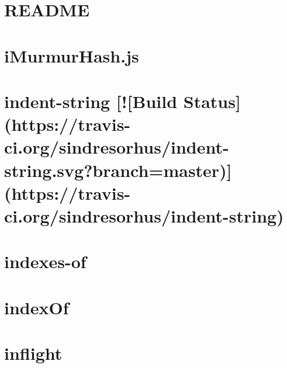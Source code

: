 \documentclass[twoside]{book}
\newcommand{\+}{\discretionary{\mbox{\scriptsize$\hookleftarrow$}}{}{}}
\begin{document}
\chapter{R\+E\+A\+D\+ME}
\label{md__c_1_workspace_demo_src_main_script_node_modules_ignore__r_e_a_d_m_e}

\chapter{i\+Murmur\+Hash.\+js}
\label{md__c_1_workspace_demo_src_main_script_node_modules_imurmurhash__r_e_a_d_m_e}

\chapter{indent-\/string \mbox{[}!\mbox{[}Build Status\mbox{]}(https\+://travis-\/ci.org/sindresorhus/indent-\/string.svg?branch=master)\mbox{]}(https\+://travis-\/ci.org/sindresorhus/indent-\/string)}
\label{md__c_1_workspace_demo_src_main_script_node_modules_indent-string_readme}

\chapter{indexes-\/of}
\label{md__c_1_workspace_demo_src_main_script_node_modules_indexes-of__r_e_a_d_m_e}

\chapter{index\+Of}
\label{md__c_1_workspace_demo_src_main_script_node_modules_indexof__readme}

\chapter{inflight}
\label{md__c_1_workspace_demo_src_main_script_node_modules_inflight__r_e_a_d_m_e}

\end{document}

